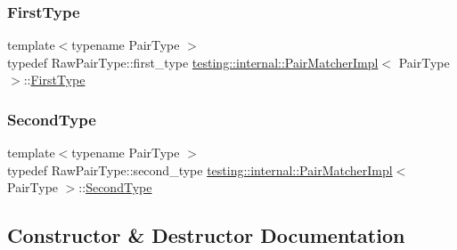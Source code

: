 \subsubsection{\texorpdfstring{First\+Type}{FirstType}}
{\footnotesize\ttfamily template$<$typename Pair\+Type $>$ \\
typedef Raw\+Pair\+Type\+::first\+\_\+type \hyperlink{classtesting_1_1internal_1_1_pair_matcher_impl}{testing\+::internal\+::\+Pair\+Matcher\+Impl}$<$ Pair\+Type $>$\+::\hyperlink{classtesting_1_1internal_1_1_pair_matcher_impl_a9de66d76f0ebb0f107a9c18903b03176}{First\+Type}}

\mbox{\label{classtesting_1_1internal_1_1_pair_matcher_impl_ad63c9ff4f1aff81562efca293ff5aca9}} 
\subsubsection{\texorpdfstring{Second\+Type}{SecondType}}
{\footnotesize\ttfamily template$<$typename Pair\+Type $>$ \\
typedef Raw\+Pair\+Type\+::second\+\_\+type \hyperlink{classtesting_1_1internal_1_1_pair_matcher_impl}{testing\+::internal\+::\+Pair\+Matcher\+Impl}$<$ Pair\+Type $>$\+::\hyperlink{classtesting_1_1internal_1_1_pair_matcher_impl_ad63c9ff4f1aff81562efca293ff5aca9}{Second\+Type}}



\subsection{Constructor \& Destructor Documentation}
\mbox{\label{classtesting_1_1internal_1_1_pair_matcher_impl_ae2615e785df46255c8695a5972ca510a}} 
